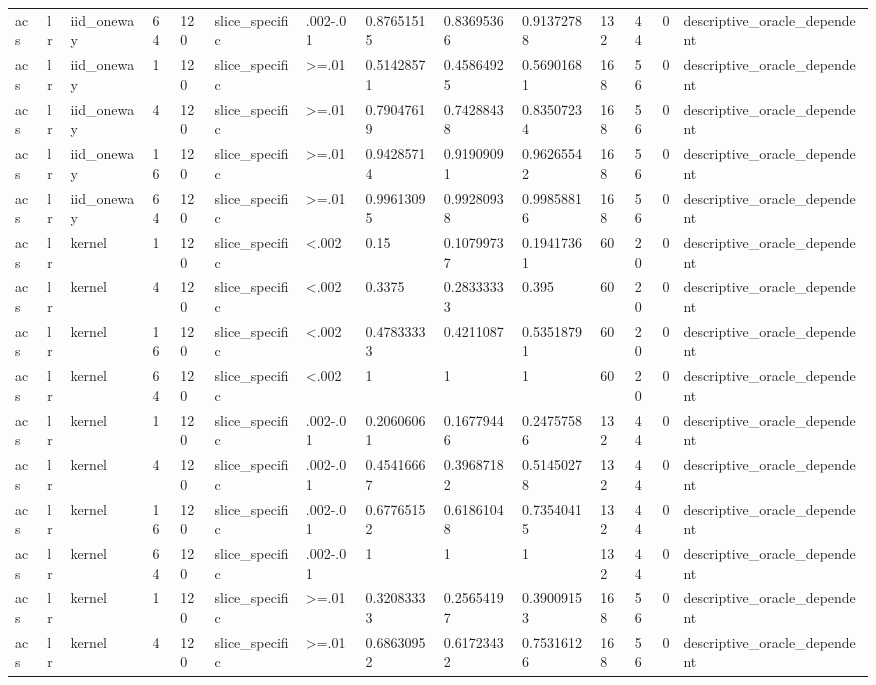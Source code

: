 \begin{tabular}{llllllllllllll}
acs & lr & iid\_oneway & 64 & 120 & slice\_specific & .002-.01 & 0.87651515 & 0.83695366 & 0.91372788 & 132 & 44 & 0 & descriptive\_oracle\_dependent \\
acs & lr & iid\_oneway & 1 & 120 & slice\_specific & >=.01 & 0.51428571 & 0.45864925 & 0.56901681 & 168 & 56 & 0 & descriptive\_oracle\_dependent \\
acs & lr & iid\_oneway & 4 & 120 & slice\_specific & >=.01 & 0.79047619 & 0.74288438 & 0.83507234 & 168 & 56 & 0 & descriptive\_oracle\_dependent \\
acs & lr & iid\_oneway & 16 & 120 & slice\_specific & >=.01 & 0.94285714 & 0.91909091 & 0.96265542 & 168 & 56 & 0 & descriptive\_oracle\_dependent \\
acs & lr & iid\_oneway & 64 & 120 & slice\_specific & >=.01 & 0.99613095 & 0.99280938 & 0.99858816 & 168 & 56 & 0 & descriptive\_oracle\_dependent \\
acs & lr & kernel & 1 & 120 & slice\_specific & <.002 & 0.15 & 0.10799737 & 0.19417361 & 60 & 20 & 0 & descriptive\_oracle\_dependent \\
acs & lr & kernel & 4 & 120 & slice\_specific & <.002 & 0.3375 & 0.28333333 & 0.395 & 60 & 20 & 0 & descriptive\_oracle\_dependent \\
acs & lr & kernel & 16 & 120 & slice\_specific & <.002 & 0.47833333 & 0.4211087 & 0.53518791 & 60 & 20 & 0 & descriptive\_oracle\_dependent \\
acs & lr & kernel & 64 & 120 & slice\_specific & <.002 & 1 & 1 & 1 & 60 & 20 & 0 & descriptive\_oracle\_dependent \\
acs & lr & kernel & 1 & 120 & slice\_specific & .002-.01 & 0.20606061 & 0.16779446 & 0.24757586 & 132 & 44 & 0 & descriptive\_oracle\_dependent \\
acs & lr & kernel & 4 & 120 & slice\_specific & .002-.01 & 0.45416667 & 0.39687182 & 0.51450278 & 132 & 44 & 0 & descriptive\_oracle\_dependent \\
acs & lr & kernel & 16 & 120 & slice\_specific & .002-.01 & 0.67765152 & 0.61861048 & 0.73540415 & 132 & 44 & 0 & descriptive\_oracle\_dependent \\
acs & lr & kernel & 64 & 120 & slice\_specific & .002-.01 & 1 & 1 & 1 & 132 & 44 & 0 & descriptive\_oracle\_dependent \\
acs & lr & kernel & 1 & 120 & slice\_specific & >=.01 & 0.32083333 & 0.25654197 & 0.39009153 & 168 & 56 & 0 & descriptive\_oracle\_dependent \\
acs & lr & kernel & 4 & 120 & slice\_specific & >=.01 & 0.68630952 & 0.61723432 & 0.75316126 & 168 & 56 & 0 & descriptive\_oracle\_dependent \\

\end{tabular}
